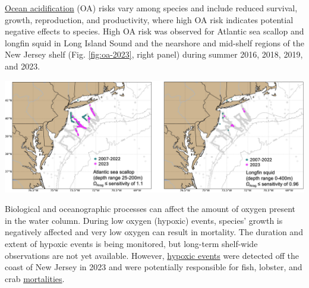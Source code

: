 \documentclass[
  10pt,
]{article}
\let\origfigure\figure
\let\endorigfigure\endfigure
\renewenvironment{figure}[1][2] {
    \expandafter\origfigure\expandafter[H]
} {
    \endorigfigure
}
\begin{document}
\href{https://noaa-edab.github.io/catalog/ocean_acidification.html}{Ocean acidification} (OA) risks vary among species and include reduced survival, growth, reproduction, and productivity, where high OA risk indicates potential negative effects to species. High OA risk was observed for Atlantic sea scallop and longfin squid in Long Island Sound and the nearshore and mid-shelf regions of the New Jersey shelf (Fig. \ref{fig:oa-2023}, right panel) during summer 2016, 2018, 2019, and 2023.

\begin{figure}

{\centering \includegraphics[width=1\linewidth]{SOE-NEFMC_files/figure-latex/oa-2023-1} 

}

\caption{Locations where bottom aragonite saturation state ($\Omega_{Arag}$; summer only: June-August) were at or below the laboratory-derived sensitivity level for Atlantic sea scallop (left panel) and longfin squid (right panel) for the time periods 2007-2022 (dark cyan) and 2023 only (magenta). Gray circles indicate locations where bottom $\Omega_{Arag}$ values were above the species specific sensitivity values.}\label{fig:oa-2023}
\end{figure}

Biological and oceanographic processes can affect the amount of oxygen present in the water column. During low oxygen (hypoxic) events, species' growth is negatively affected and very low oxygen can result in mortality. The duration and extent of hypoxic events is being monitored, but long-term shelf-wide observations are not yet available. However, \href{https://noaa-edab.github.io/catalog/observation_synthesis.html}{hypoxic events} were detected off the coast of New Jersey in 2023 and were potentially responsible for fish, lobster, and crab \href{https://sebsnjaesnews.rutgers.edu/2023/12/rutgers-scientists-observe-unusual-ocean-conditions-possibly-linked-to-mortality-in-marine-life-off-new-jersey/}{mortalities}.
\end{document}
